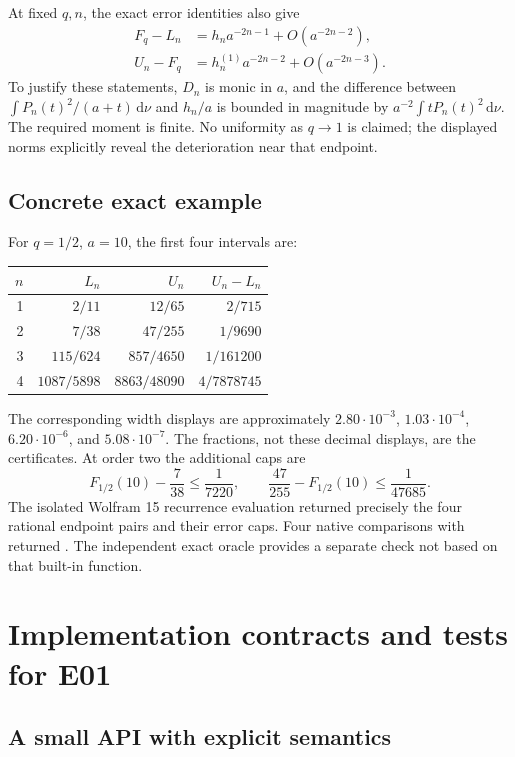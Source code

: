 \documentclass[11pt,a4paper]{article}
\theoremstyle{remark}\newtheorem{remark}[theorem]{Remark}
\newcommand{\code}[1]{\texttt{\detokenize{#1}}}
\newcommand{\dd}{\,\mathrm d}
\begin{document}
At fixed $q,n$, the exact error identities also give
\begin{align}
 F_q-L_n&=h_n a^{-2n-1}+O(a^{-2n-2}),\\
 U_n-F_q&=h_n^{(1)}a^{-2n-2}+O(a^{-2n-3}).
\end{align}
To justify these statements, $D_n$ is monic in $a$, and the difference between
$\int P_n(t)^2/(a+t)\dd\nu$ and $h_n/a$ is bounded in magnitude by
$a^{-2}\int tP_n(t)^2\dd\nu$. The required moment is finite. No uniformity as
$q\to1$ is claimed; the displayed norms explicitly reveal the deterioration
near that endpoint.

\subsection{Concrete exact example}

For $q=1/2$, $a=10$, the first four intervals are:
\begin{center}
\begin{tabular}{@{}rrrr@{}}\toprule
$n$ & $L_n$ & $U_n$ & $U_n-L_n$\\\midrule
1 & $2/11$ & $12/65$ & $2/715$\\
2 & $7/38$ & $47/255$ & $1/9690$\\
3 & $115/624$ & $857/4650$ & $1/161200$\\
4 & $1087/5898$ & $8863/48090$ & $4/7878745$\\
\bottomrule\end{tabular}
\end{center}
The corresponding width displays are approximately
$2.80\cdot10^{-3}$, $1.03\cdot10^{-4}$, $6.20\cdot10^{-6}$, and
$5.08\cdot10^{-7}$. The fractions, not these decimal displays, are the
certificates. At order two the additional caps are
\[
 F_{1/2}(10)-\frac7{38}\leq\frac1{7220},\qquad
 \frac{47}{255}-F_{1/2}(10)\leq\frac1{47685}.
\]
The isolated Wolfram 15 recurrence evaluation returned precisely the four
rational endpoint pairs and their error caps. Four native comparisons with
\code{LerchPhi[1/2,1,10]} returned \code{True}. The independent exact oracle
provides a separate check not based on that built-in function.

\section{Implementation contracts and tests for E01}
\label{sec:implementation}

\subsection{A small API with explicit semantics}
\end{document}
